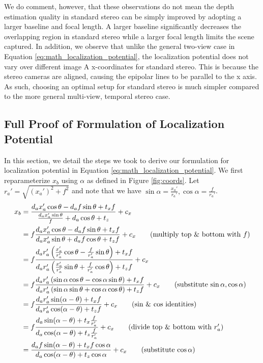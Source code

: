 \documentclass[runningheads, hyperfootnotes=false]{article}
\begin{document}
We do comment, however, that these observations do not mean the depth estimation quality in standard stereo can be simply improved by adopting a larger baseline and focal length. A larger baseline significantly decreases the overlapping region in standard stereo while a larger focal length limits the scene captured. In addition, we observe that unlike the general two-view case in Equation \ref{eq:math_localization_potential}, the localization potential does not vary over different image A x-coordinates for standard stereo. This is because the stereo cameras are aligned, causing the epipolar lines to be parallel to the x axis. As such, choosing an optimal setup for standard stereo is much simpler compared to the more general multi-view, temporal stereo case.

\subsection{Full Proof of Formulation of Localization Potential}\label{app:theory_loc_potential}
In this section, we detail the steps we took to derive our formulation for localization potential in Equation \ref{eq:math_localization_potential}. We first reparameterize $x_b$ using $\alpha$ as defined in Figure \ref{fig:coords}. Let $r_a' = \sqrt{(x_a')^2 + f^2}$ and note that we have $\sin{\alpha} = \frac{x_a'}{r_a'}, \cos{\alpha} = \frac{f}{r_a'}$. 
\begin{align*}
x_b &= \frac{d_a x_a' \cos{\theta} - d_a f \sin{\theta} + t_x f}{\frac{d_a x_a' \sin{\theta}}{f} + d_a \cos{\theta} + t_z} + c_x \\
    &= f \frac{d_a x_a' \cos{\theta} - d_a f \sin{\theta} + t_x f}{d_a x_a' \sin{\theta} + d_a f \cos{\theta} + t_z f} + c_x \tag{multiply top \& bottom with $f$} \\
    &= f \frac{d_a r_a' \left(\frac{x_a'}{r_a'} \cos{\theta} - \frac{f}{r_a'} \sin{\theta}\right) + t_x f}{d_a r_a' \left( \frac{x_a'}{r_a'} \sin{\theta} + \frac{f}{r_a'} \cos{\theta} \right) + t_z f} + c_x \\
    &= f \frac{d_a r_a' \left(\sin{\alpha} \cos{\theta} - \cos{\alpha}  \sin{\theta}\right) + t_x f}{d_a r_a' \left( \sin{\alpha} \sin{\theta} + \cos{\alpha} \cos{\theta} \right) + t_z f} + c_x \tag{substitute $\sin{\alpha}, \cos{\alpha}$}\\
    &= f \frac{d_a r_a' \sin(\alpha - \theta) + t_x f}{d_a r_a' \cos(\alpha - \theta) + t_z f} + c_x \tag{sin \& cos identities} \\
    &= f \frac{d_a \sin(\alpha - \theta) + t_x \frac{f}{r_a'}}{d_a \cos(\alpha - \theta) + t_z \frac{f}{r_a'}} + c_x \tag{divide top \& bottom with $r_a'$} \\
    &= \frac{d_a f \sin(\alpha - \theta) + t_x f \cos{\alpha}}{d_a \cos(\alpha - \theta) + t_z \cos{\alpha}} + c_x \tag{substitute $\cos{\alpha}$} \\
\end{align*}
\end{document}
